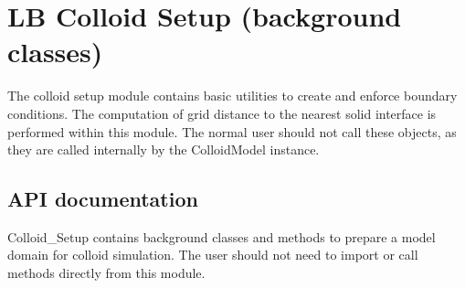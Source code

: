 \documentclass[letterpaper,10pt,english]{sphinxmanual}
\begin{document}
\section{LB Colloid Setup (background classes)}
\label{\detokenize{index:lb-colloid-setup-background-classes}}
The colloid setup module contains basic utilities to create and enforce boundary conditions. The computation of grid distance to the nearest solid interface is performed within this module. The normal user should not call these objects, as they are called internally by the ColloidModel instance.


\subsection{API documentation}
\label{\detokenize{index:id54}}\label{\detokenize{index:module-lb_colloids.Colloids.Colloid_Setup}}
Colloid\_Setup contains background classes and methods to prepare a
model domain for colloid simulation. The user should not need to
import or call methods directly from this module.
\end{document}
